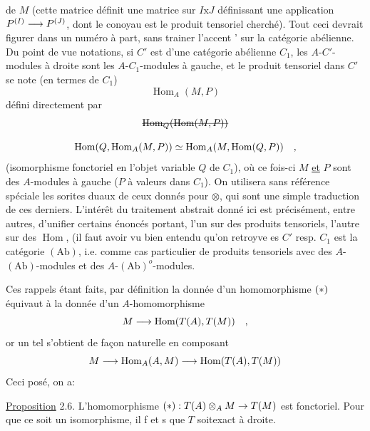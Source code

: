  de $M$ (cette matrice définit une matrice sur $I\mathbin{\mathrm{x}}J$\handwritten{,} définissant une
application $P^{(I)}\longrightarrow P^{(J)}$, dont le conoyau est le produit tensoriel cherché).
Tout ceci devrait figurer dans un numéro à part, sans trainer l'accent '
sur la catégorie abélienne. Du point de vue notations, si $C'$ est 
d'une catégorie abélienne $C_1$,  les $A$-$C'$-modules à droite
sont les $A$-$C_1$-modules à gauche, et le produit tensoriel dans $C'$ se note
(en termes de $C_1$)
\[
\operatorname{Hom}_A(M,P)
\]
défini directement par
\[
\deleted{\operatorname{Hom}_{Q}(\operatorname{Hom}(M,P))}
\]

\[
\operatorname{Hom}(Q,\operatorname{Hom}_A(M,P))\simeq\operatorname{Hom}_A(M,\operatorname{Hom}(Q,P))\quad,
\]
(isomorphisme fonctoriel en l'objet variable $Q$ de $C_1$), où ce fois-ci $M$ \uline{et}
$P$ sont des $A$-modules à gauche ($P$ à valeurs dans $C_1$). On utilisera sans
référence spéciale les sorites duaux de ceux donnés pour $\otimes$, qui sont une
simple traduction de ces derniers. L'intérêt du traitement abstrait donné
ici est précisément, entre autres, d'unifier certains énoncés  portant, 
l'un sur des produits tensoriels, l'autre sur des $\operatorname{Hom}$,
(il faut avoir vu bien entendu qu'on retroyve es 
$C'$ resp. $C_1$ est la catégorie $(\mathrm{Ab})$, i.e. comme cas particulier de produits
tensoriels avec des $A$-$(\mathrm{Ab})$-modules et des $A$-$(\mathrm{Ab})^{o}$-modules\handwritten{)}.

Ces rappels étant faits, par définition la donnée d'un homomorphisme
$(*)$ équivaut à la donnée d'un $A$-homomorphisme
\[
M\longrightarrow\operatorname{Hom}(T(A),T(M))\quad,
\]
or un tel s'obtient de façon naturelle en composant
\[
M\longrightarrow\operatorname{Hom}_A(A,M)\longrightarrow\operatorname{Hom}(T(A),T(M))
\]
Ceci posé, on a:

\uline{Proposition} 2.6. L'homomorphisme $(*):T(A)\otimes_A M\to T(M)$ est fonctoriel.
Pour que ce soit un isomorphisme, il f et s que $T$ soit\handwritten{\unsure{/}}exact à droite.

